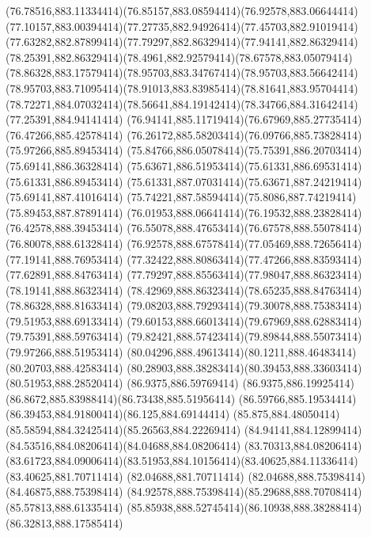 {{	\curveto(76.78516,883.11334414)(76.85157,883.08594414)(76.92578,883.06644414)
	\curveto(77.10157,883.00394414)(77.27735,882.94926414)(77.45703,882.91019414)
	\curveto(77.63282,882.87899414)(77.79297,882.86329414)(77.94141,882.86329414)
	\curveto(78.25391,882.86329414)(78.4961,882.92579414)(78.67578,883.05079414)
	\curveto(78.86328,883.17579414)(78.95703,883.34767414)(78.95703,883.56642414)
	\curveto(78.95703,883.71095414)(78.91013,883.83985414)(78.81641,883.95704414)
	\curveto(78.72271,884.07032414)(78.56641,884.19142414)(78.34766,884.31642414)
	\lineto(77.25391,884.94141414)
	\curveto(76.94141,885.11719414)(76.67969,885.27735414)(76.47266,885.42578414)
	\curveto(76.26172,885.58203414)(76.09766,885.73828414)(75.97266,885.89453414)
	\curveto(75.84766,886.05078414)(75.75391,886.20703414)(75.69141,886.36328414)
	\curveto(75.63671,886.51953414)(75.61331,886.69531414)(75.61331,886.89453414)
	\curveto(75.61331,887.07031414)(75.63671,887.24219414)(75.69141,887.41016414)
	\curveto(75.74221,887.58594414)(75.8086,887.74219414)(75.89453,887.87891414)
	\curveto(76.01953,888.06641414)(76.19532,888.23828414)(76.42578,888.39453414)
	\curveto(76.55078,888.47653414)(76.67578,888.55078414)(76.80078,888.61328414)
	\curveto(76.92578,888.67578414)(77.05469,888.72656414)(77.19141,888.76953414)
	\curveto(77.32422,888.80863414)(77.47266,888.83593414)(77.62891,888.84763414)
	\curveto(77.79297,888.85563414)(77.98047,888.86323414)(78.19141,888.86323414)
	\curveto(78.42969,888.86323414)(78.65235,888.84763414)(78.86328,888.81633414)
	\curveto(79.08203,888.79293414)(79.30078,888.75383414)(79.51953,888.69133414)
	\curveto(79.60153,888.66013414)(79.67969,888.62883414)(79.75391,888.59763414)
	\curveto(79.82421,888.57423414)(79.89844,888.55073414)(79.97266,888.51953414)
	\curveto(80.04296,888.49613414)(80.1211,888.46483414)(80.20703,888.42583414)
	\curveto(80.28903,888.38283414)(80.39453,888.33603414)(80.51953,888.28520414)
	\closepath
	\moveto(86.9375,886.59769414)
	\curveto(86.9375,886.19925414)(86.8672,885.83988414)(86.73438,885.51956414)
	\curveto(86.59766,885.19534414)(86.39453,884.91800414)(86.125,884.69144414)
	\curveto(85.875,884.48050414)(85.58594,884.32425414)(85.26563,884.22269414)
	\curveto(84.94141,884.12899414)(84.53516,884.08206414)(84.04688,884.08206414)
	\lineto(83.70313,884.08206414)
	\curveto(83.61723,884.09006414)(83.51953,884.10156414)(83.40625,884.11336414)
	\lineto(83.40625,881.70711414)
	\lineto(82.04688,881.70711414)
	\lineto(82.04688,888.75398414)
	\lineto(84.46875,888.75398414)
	\curveto(84.92578,888.75398414)(85.29688,888.70708414)(85.57813,888.61335414)
	\curveto(85.85938,888.52745414)(86.10938,888.38288414)(86.32813,888.17585414)
}}
